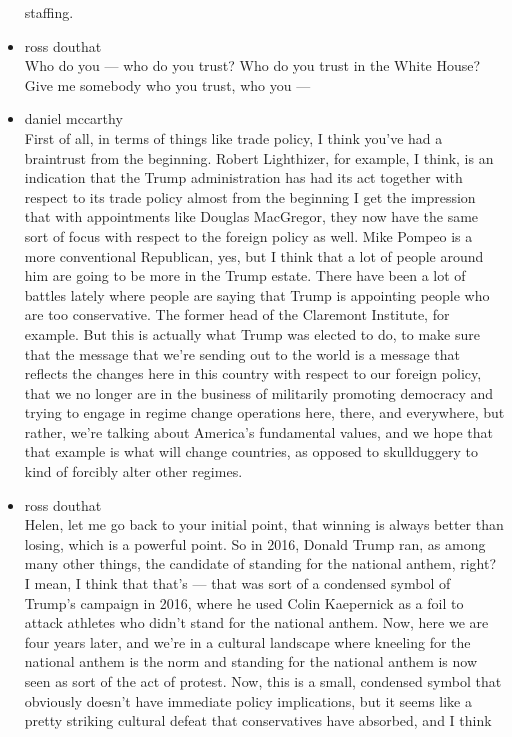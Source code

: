 \begin{itemize}
  staffing.
\item
  ross douthat\\
  Who do you --- who do you trust? Who do you trust in the White House?
  Give me somebody who you trust, who you ---
\item
  daniel mccarthy\\
  First of all, in terms of things like trade policy, I think you've had
  a braintrust from the beginning. Robert Lighthizer, for example, I
  think, is an indication that the Trump administration has had its act
  together with respect to its trade policy almost from the beginning I
  get the impression that with appointments like Douglas MacGregor, they
  now have the same sort of focus with respect to the foreign policy as
  well. Mike Pompeo is a more conventional Republican, yes, but I think
  that a lot of people around him are going to be more in the Trump
  estate. There have been a lot of battles lately where people are
  saying that Trump is appointing people who are too conservative. The
  former head of the Claremont Institute, for example. But this is
  actually what Trump was elected to do, to make sure that the message
  that we're sending out to the world is a message that reflects the
  changes here in this country with respect to our foreign policy, that
  we no longer are in the business of militarily promoting democracy and
  trying to engage in regime change operations here, there, and
  everywhere, but rather, we're talking about America's fundamental
  values, and we hope that that example is what will change countries,
  as opposed to skullduggery to kind of forcibly alter other regimes.
\item
  ross douthat\\
  Helen, let me go back to your initial point, that winning is always
  better than losing, which is a powerful point. So in 2016, Donald
  Trump ran, as among many other things, the candidate of standing for
  the national anthem, right? I mean, I think that that's --- that was
  sort of a condensed symbol of Trump's campaign in 2016, where he used
  Colin Kaepernick as a foil to attack athletes who didn't stand for the
  national anthem. Now, here we are four years later, and we're in a
  cultural landscape where kneeling for the national anthem is the norm
  and standing for the national anthem is now seen as sort of the act of
  protest. Now, this is a small, condensed symbol that obviously doesn't
  have immediate policy implications, but it seems like a pretty
  striking cultural defeat that conservatives have absorbed, and I think

\end{itemize}

